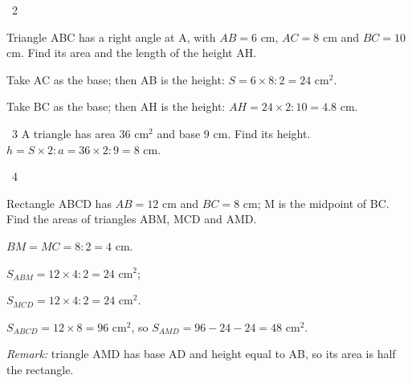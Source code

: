 \gap
\begin{exbox}{\ExWord\ 2}
\begin{minipage}[t]{0.62\linewidth}
Triangle ABC has a right angle at A, with $AB=6$ cm, $AC=8$ cm and $BC=10$ cm. Find its area and the length of the height AH.
\end{minipage}\hfill
\begin{minipage}[t]{0.34\linewidth}\vspace{0pt}\centering
{}
\end{minipage}
\guide
Take AC as the base; then AB is the height: $S=6\times8:2=24$ cm$^2$.\par
Take BC as the base; then AH is the height: $AH=24\times2:10=4.8$ cm.
\end{exbox}
\gap
\begin{exbox}{\ExWord\ 3}
A triangle has area $36$ cm$^2$ and base $9$ cm. Find its height.
\guide
$h=S\times2:a=36\times2:9=8$ cm.
\end{exbox}
\gap
\begin{exbox}{\ExWord\ 4}
\begin{minipage}[t]{0.6\linewidth}
Rectangle ABCD has $AB=12$ cm and $BC=8$ cm; M is the midpoint of BC. Find the areas of triangles ABM, MCD and AMD.
\end{minipage}\hfill
\begin{minipage}[t]{0.36\linewidth}\vspace{0pt}\centering
{}
\end{minipage}
\guide
$BM=MC=8:2=4$ cm.\par $S_{ABM}=12\times4:2=24$ cm$^2$;\par $S_{MCD}=12\times4:2=24$ cm$^2$.\par
$S_{ABCD}=12\times8=96$ cm$^2$, so $S_{AMD}=96-24-24=48$ cm$^2$.\par
\emph{Remark:} triangle AMD has base AD and height equal to AB, so its area is half the rectangle.
\end{exbox}
